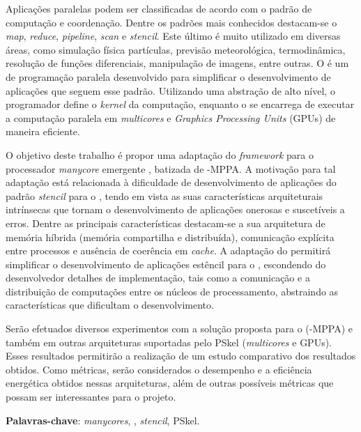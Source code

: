 
\setlength{\absparsep}{18pt} %
\begin{resumo}
Aplicações paralelas podem ser classificadas de acordo com o padrão de computação e coordenação. Dentre os padrões mais conhecidos destacam-se o \textit{map}, \textit{reduce}, \textit{pipeline}, \textit{scan} e \textit{stencil}. Este último é muito utilizado em diversas áreas, como simulação física partículas, previsão meteorológica, termodinâmica, resolução de funções diferenciais, manipulação de imagens, entre outras. O \pskel é um \fw de programação paralela desenvolvido para simplificar o desenvolvimento de aplicações que seguem esse padrão. Utilizando uma abstração de alto nível, o programador define o \emph{kernel} da computação, enquanto o \fw se encarrega de executar a computação paralela em \textit{multicores} e \textit{Graphics Processing Units} (GPUs) de maneira eficiente. 

O objetivo deste trabalho é propor uma adaptação do \textit{framework} \pskel para o processador \textit{manycore} emergente \mppa, batizada de \pskel-MPPA. A motivação para tal adaptação está relacionada à dificuldade de desenvolvimento de aplicações do padrão \textit{stencil} para o \mppa, tendo em vista as suas características arquiteturais intrínsecas que tornam o desenvolvimento de aplicações onerosas e suscetíveis a erros. Dentre as principais características destacam-se a sua arquitetura de memória híbrida (memória compartilha e distribuída), comunicação explícita entre processos e ausência de coerência em \textit{cache}. A adaptação do \fw permitirá simplificar o desenvolvimento de aplicações estêncil para o \mppa, escondendo do desenvolvedor detalhes de implementação, tais como a comunicação e a distribuição de computações entre os núcleos de processamento, abstraindo as características que dificultam o desenvolvimento. 

Serão efetuados diversos experimentos com a solução proposta para o \mppa (\pskel-MPPA) e também em outras arquiteturas suportadas pelo PSkel (\textit{multicores} e GPUs). Esses resultados permitirão a realização de um estudo comparativo dos resultados obtidos. Como métricas, serão considerados o desempenho e a eficiência energética obtidos nessas arquiteturas, além de outras possíveis métricas que possam ser interessantes para o projeto.

 \textbf{Palavras-chave}: \textit{manycores}, \mppa, \textit{stencil}, PSkel.
\end{resumo}

